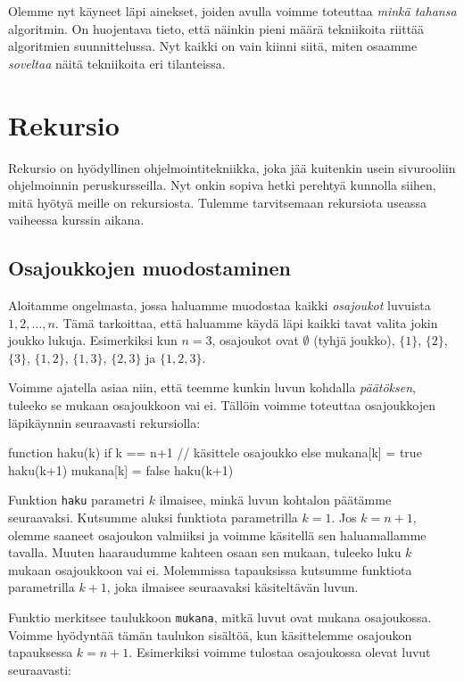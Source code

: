Olemme nyt käyneet läpi ainekset,
joiden avulla voimme toteuttaa \emph{minkä tahansa} algoritmin.
On huojentava tieto, että näinkin pieni määrä tekniikoita
riittää algoritmien suunnittelussa.
Nyt kaikki on vain kiinni siitä, miten osaamme \emph{soveltaa}
näitä tekniikoita eri tilanteissa.

\section{Rekursio}


Rekursio on hyödyllinen ohjelmointitekniikka,
joka jää kuitenkin usein sivurooliin ohjelmoinnin peruskursseilla.
Nyt onkin sopiva hetki perehtyä kunnolla siihen,
mitä hyötyä meille on rekursiosta.
Tulemme tarvitsemaan rekursiota useassa vaiheessa kurssin aikana.

\subsection{Osajoukkojen muodostaminen}


Aloitamme ongelmasta, jossa haluamme muodostaa
kaikki \emph{osajoukot} luvuista $1,2,\dots,n$.
Tämä tarkoittaa, että haluamme käydä läpi kaikki tavat
valita jokin joukko lukuja.
Esimerkiksi kun $n=3$, osajoukot ovat
$\emptyset$ (tyhjä joukko), $\{1\}$, $\{2\}$, $\{3\}$,
$\{1,2\}$, $\{1,3\}$, $\{2,3\}$ ja $\{1,2,3\}$.

Voimme ajatella asiaa niin, että teemme kunkin luvun
kohdalla \emph{päätöksen}, tuleeko se mukaan osajoukkoon vai ei.
Tällöin voimme toteuttaa osajoukkojen läpikäynnin
seuraavasti rekursiolla:

\begin{code}
function haku(k)
    if k == n+1
        // käsittele osajoukko
    else
        mukana[k] = true
        haku(k+1)
        mukana[k] = false
        haku(k+1)
\end{code}

Funktion \texttt{haku} parametri $k$ ilmaisee,
minkä luvun kohtalon päätämme seuraavaksi.
Kutsumme aluksi funktiota parametrilla $k=1$.
Jos $k=n+1$, olemme saaneet osajoukon valmiiksi
ja voimme käsitellä sen haluamallamme tavalla.
Muuten haaraudumme kahteen osaan sen mukaan,
tuleeko luku $k$ mukaan osajoukkoon vai ei.
Molemmissa tapauksissa kutsumme funktiota parametrilla $k+1$,
joka ilmaisee seuraavaksi käsiteltävän luvun.

Funktio merkitsee taulukkoon \texttt{mukana},
mitkä luvut ovat mukana osajoukossa.
Voimme hyödyntää tämän taulukon sisältöä,
kun käsittelemme osajoukon tapauksessa $k=n+1$.
Esimerkiksi voimme tulostaa osajoukossa olevat luvut seuraavasti:


